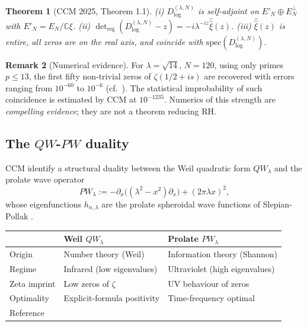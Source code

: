 \documentclass[11pt,a4paper]{article}
\theoremstyle{plain}
\newtheorem{theorem}{Theorem}[section]
\theoremstyle{definition}
\newtheorem{remark}[theorem]{Remark}
\newcommand{\C}{\mathbb{C}}
\begin{document}
\begin{theorem}[CCM 2025, Theorem 1.1]\label{thm:ccm-mainthm}
(i) $D^{(\lambda,N)}_{\log}$ is self-adjoint on $E'_N \oplus
E_N^\perp$ with $E'_N = E_N/\C\xi$.
(ii) $\det_{\mathrm{reg}}(D^{(\lambda,N)}_{\log} - z) = -i
\lambda^{-iz}\widehat{\widehat\xi}(z)$.
(iii) $\widehat{\widehat\xi}(z)$ is entire, all zeros are on the
real axis, and coincide with $\mathrm{spec}(D^{(\lambda,N)}_{\log})$.
\end{theorem}

\begin{remark}[Numerical evidence]\label{rem:ccm-numerics}
For $\lambda = \sqrt{14}$, $N = 120$, using only primes
$p \leq 13$, the first fifty non-trivial zeros of $\zeta(1/2+is)$
are recovered with errors ranging from $10^{-60}$ to $10^{-6}$
(cf.~\cite[Table~1]{ConnesConsaniMoscovici2025}).  The statistical
improbability of such coincidence is estimated by CCM at
$10^{-1235}$.  Numerics of this strength are \emph{compelling
evidence}; they are not a theorem reducing RH.
\end{remark}

\subsection{The \texorpdfstring{$QW$-$PW$}{QW-PW} duality}
\label{sec:ccm-duality}

CCM identify a structural duality between the Weil quadratic form
$QW_\lambda$ and the prolate wave operator
\[
  PW_\lambda := -\partial_x\big((\lambda^2-x^2)\partial_x\big) +
    (2\pi\lambda x)^2,
\]
whose eigenfunctions $h_{n,\lambda}$ are the prolate spheroidal
wave functions of Slepian-Pollak
\cite{SlepianPollack1961}.

\begin{center}
\small
\begin{tabular}{@{}lll@{}}
\toprule
& \textbf{Weil $QW_\lambda$} & \textbf{Prolate $PW_\lambda$} \\
\midrule
Origin        & Number theory (Weil) & Information theory (Shannon) \\
Regime        & Infrared (low eigenvalues) & Ultraviolet (high eigenvalues)\\
Zeta imprint  & Low zeros of $\zeta$ & UV behaviour of zeros\\
Optimality    & Explicit-formula positivity & Time-frequency optimal \\
Reference     & \cite{ConnesConsaniMoscovici2025} & \cite{ConnesMoscovici2022} \\
\bottomrule
\end{tabular}
\end{center}
\end{document}
